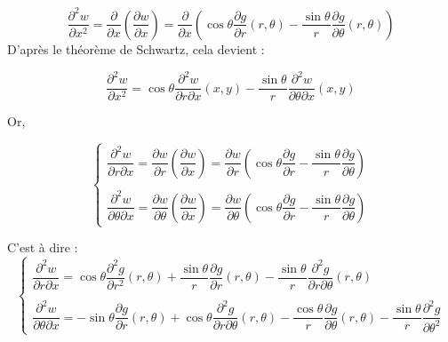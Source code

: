 \documentclass[a4,12pt]{article}
\begin{document}
\begin{itemize}
			  \[
			    \dfrac{\partial^2 w}{\partial x^2} = \dfrac{\partial}{\partial x}\left( \dfrac{\partial w}{\partial x}\right) = \dfrac{\partial}{\partial x} \left( \cos \theta \dfrac{\partial g}{\partial r}(r,\theta) - \dfrac{\sin \theta}{r} \dfrac{\partial g}{\partial \theta}(r,\theta)  \right)
			  \]
			  D'après le théorème de Schwartz, cela devient :

			  \[
			    \dfrac{\partial^2 w}{\partial x^2} = \cos \theta \dfrac{\partial^2 w}{\partial r \partial x}(x,y) - \dfrac{\sin \theta}{r} \dfrac{\partial^2 w}{\partial \theta \partial x}(x,y)
			  \]

			  Or,

			  \begin{equation*}{}
			    \left\{
			      \begin{array}{l}
				\dfrac{\partial^2 w}{\partial r \partial x} = \dfrac{\partial w}{\partial r}\left(\dfrac{\partial w}{\partial x}\right) = \dfrac{\partial w}{\partial r}\left(\cos \theta \dfrac{\partial g}{\partial r} - \dfrac{\sin \theta}{r} \dfrac{\partial g}{\partial \theta}\right)\\\\
				\dfrac{\partial^2 w}{\partial \theta \partial x} = \dfrac{\partial w}{\partial \theta}\left(\dfrac{\partial w}{\partial x}\right) = \dfrac{\partial w}{\partial \theta}\left(\cos \theta \dfrac{\partial g}{\partial r} - \dfrac{\sin \theta}{r} \dfrac{\partial g}{\partial \theta} \right)
			      \end{array}
			      \right.
			    \end{equation*}

			    C'est à dire :
			    \begin{equation*}{}
			      \left\{
				\begin{array}{l}
				  \dfrac{\partial^2 w}{\partial r \partial x} = \cos \theta \dfrac{\partial^2 g}{\partial r^2}(r,\theta) + \dfrac{\sin \theta}{r} \dfrac{\partial g}{\partial r}(r,\theta) - \dfrac{\sin \theta}{r} \dfrac{\partial^2 g}{\partial r \partial \theta}(r,\theta)  \\\\
				  \dfrac{\partial^2 w}{\partial \theta \partial x} = - \sin \theta \dfrac{\partial g}{\partial r}(r,\theta) + \cos \theta \dfrac{\partial^2 g}{\partial r \partial \theta}(r,\theta) - \dfrac{\cos \theta}{r} \dfrac{\partial g}{\partial \theta}(r,\theta) - \dfrac{\sin \theta}{r} \dfrac{\partial^2 g}{\partial \theta^2}
				\end{array}
				\right.
			      \end{equation*}


\end{itemize}
\end{document}

